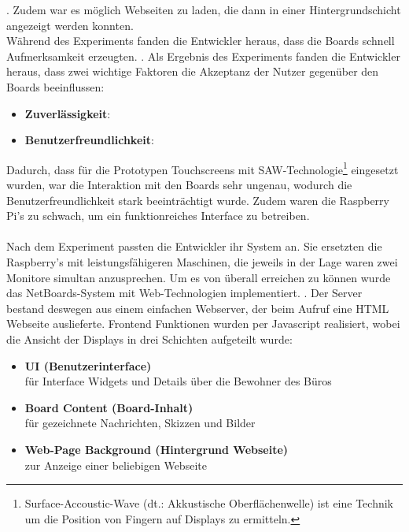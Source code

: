. Zudem war es möglich Webseiten zu laden, die dann in einer Hintergrundschicht angezeigt werden konnten.
\\
Während des Experiments fanden die Entwickler heraus, dass die Boards schnell Aufmerksamkeit erzeugten. .
Als Ergebnis des Experiments fanden die Entwickler heraus, dass zwei wichtige Faktoren die Akzeptanz der Nutzer gegenüber den Boards beeinflussen:
\begin{itemize}
  \item \textbf{Zuverlässigkeit}: 
  \item \textbf{Benutzerfreundlichkeit}: 
\end{itemize}
Dadurch, dass für die Prototypen Touchscreens mit SAW-Technologie\footnote{Surface-Accoustic-Wave (dt.: Akkustische Oberflächenwelle) ist eine Technik um die Position von Fingern auf Displays zu ermitteln.} eingesetzt wurden, war die Interaktion mit den Boards sehr ungenau, wodurch die Benutzerfreundlichkeit stark beeinträchtigt wurde.
Zudem waren die Raspberry Pi's zu schwach, um ein funktionreiches Interface zu betreiben.
\\
\\
Nach dem Experiment passten die Entwickler ihr System an.
Sie ersetzten die Raspberry's mit leistungsfähigeren Maschinen, die jeweils in der Lage waren zwei Monitore simultan anzusprechen.
Um es von überall erreichen zu können wurde das NetBoards-System mit Web-Technologien implementiert. .
Der Server bestand deswegen aus einem einfachen Webserver, der beim Aufruf eine HTML Webseite auslieferte. Frontend Funktionen wurden per Javascript realisiert, wobei die Ansicht der Displays in drei Schichten aufgeteilt wurde\cite{wood:2014}:
\begin{itemize}
  \item \textbf{UI (Benutzerinterface)}\\
    für Interface Widgets und Details über die Bewohner des Büros
  \item \textbf{Board Content (Board-Inhalt)}\\
    für gezeichnete Nachrichten, Skizzen und Bilder
  \item \textbf{Web-Page Background (Hintergrund Webseite)}\\
    zur Anzeige einer beliebigen Webseite
\end{itemize}
